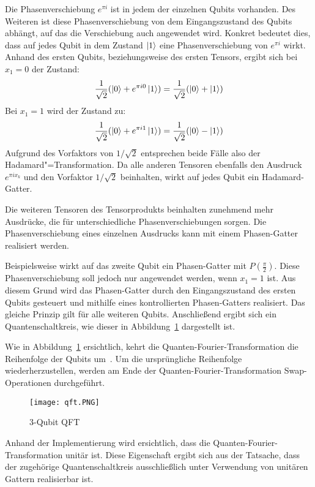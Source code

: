 Die Phasenverschiebung \(e^{\pi i}\) ist in jedem der einzelnen Qubits vorhanden.
Des Weiteren ist diese Phasenverschiebung von dem Eingangszustand des Qubits abhängt,
auf das die Verschiebung auch angewendet wird. 
Konkret bedeutet dies, 
dass auf jedes Qubit in dem Zustand \(\ket{1}\) eine Phasenverschiebung von \(e^{\pi i}\) wirkt.
Anhand des ersten Qubits, 
beziehungsweise des ersten Tensors, 
ergibt sich bei \(x_1 = 0\)
der Zustand: 
\[\frac{1}{\sqrt{2}}(\ket{0} + e^{\pi i 0} \ket{1}) = \frac{1}{\sqrt{2}}(\ket{0} + \ket{1})\]
Bei \(x_1 = 1\) wird der Zustand zu:
\[\frac{1}{\sqrt{2}}(\ket{0} + e^{\pi i 1} \ket{1}) = \frac{1}{\sqrt{2}}(\ket{0} - \ket{1})\]
Aufgrund des Vorfaktors von \(1/\sqrt{2}\) entsprechen beide Fälle also der Hadamard"=Transformation.
Da alle anderen Tensoren ebenfalls den Ausdruck \(e^{\pi i x_k}\) 
und den Vorfaktor \(1/\sqrt{2}\) beinhalten, 
wirkt auf jedes Qubit ein Hadamard-Gatter.

Die weiteren Tensoren des Tensorprodukts beinhalten zunehmend mehr Ausdrücke, 
die für unterschiedliche Phasenverschiebungen sorgen. 
Die Phasenverschiebung eines einzelnen Ausdrucks kann mit einem Phasen-Gatter realisiert werden. 

Beispielsweise wirkt auf das zweite Qubit ein Phasen-Gatter mit \(P(\frac{\pi}{2} )\).
Diese Phasenverschiebung soll jedoch nur angewendet werden, 
wenn \(x_1 = 1\) ist.
Aus diesem Grund wird das Phasen-Gatter durch den Eingangszustand des ersten Qubits gesteuert und 
mithilfe eines kontrollierten Phasen-Gatters realisiert.
Das gleiche Prinzip gilt für alle weiteren Qubits.
Anschließend ergibt sich ein Quantenschaltkreis, 
wie dieser in Abbildung~\ref{fig:qft} dargestellt ist.

Wie in Abbildung~\ref{fig:qft} ersichtlich, 
kehrt die Quanten-Fourier-Transformation die Reihenfolge der Qubits um~\cite[217]{homeister2023quantum215}.
Um die ursprüngliche Reihenfolge wiederherzustellen, 
werden am Ende der Quanten-Fourier-Transformation Swap-Operationen durchgeführt.
\begin{figure}[H]
  \centering
  \texttt{[image: qft.PNG]}
  \caption{3-Qubit QFT}
  \label{fig:qft}
\end{figure}

Anhand der Implementierung wird ersichtlich,
dass die Quanten-Fourier-Transformation unitär ist. 
Diese Eigenschaft ergibt sich aus der Tatsache, 
dass der zugehörige Quantenschaltkreis ausschließlich unter Verwendung von unitären Gattern realisierbar ist.

